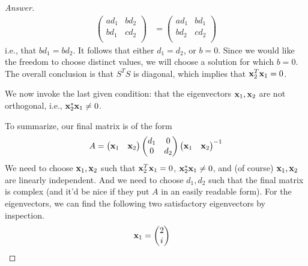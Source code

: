 \documentclass[../psets.tex]{subfiles}
\begin{document}
\begin{enumerate}[label={\textbf{2.\arabic*.}}]
\begin{enumerate}
\begin{proof}[Answer]
\begin{align*}
\begin{pmatrix}
                    ad_1 & bd_2\\
                    bd_1 & cd_2\\
                \end{pmatrix}
                &=
                \begin{pmatrix}
                    ad_1 & bd_1\\
                    bd_2 & cd_2\\
                \end{pmatrix}
            \end{align*}
            i.e., that $bd_1=bd_2$. It follows that either $d_1=d_2$, or $b=0$. Since we would like the freedom to choose distinct values, we will choose a solution for which $b=0$. The overall conclusion is that $S^TS$ is diagonal, which implies that $\mathbf{x}_2^T\mathbf{x}_1=0$.\par
            We now invoke the last given condition: that the eigenvectors $\mathbf{x}_1,\mathbf{x}_2$ are not orthogonal, i.e., $\mathbf{x}_2^*\mathbf{x}_1\neq 0$.\par
            To summarize, our final matrix is of the form
            \begin{equation*}
                A =
                \begin{pmatrix}
                    \mathbf{x}_1 & \mathbf{x}_2
                \end{pmatrix}
                \begin{pmatrix}
                    d_1 & 0\\
                    0 & d_2\\
                \end{pmatrix}
                \begin{pmatrix}
                    \mathbf{x}_1 & \mathbf{x}_2
                \end{pmatrix}^{-1}
            \end{equation*}
            We need to choose $\mathbf{x}_1,\mathbf{x}_2$ such that $\mathbf{x}_2^T\mathbf{x}_1=0$, $\mathbf{x}_2^*\mathbf{x}_1\neq 0$, and (of course) $\mathbf{x}_1,\mathbf{x}_2$ are linearly independent. And we need to choose $d_1,d_2$ such that the final matrix is complex (and it'd be nice if they put $A$ in an easily readable form). For the eigenvectors, we can find the following two satisfactory eigenvectors by inspection.
            \begin{align*}
                \x_1 &=
                \begin{pmatrix}
                    2\\
                    i\\
                \end{pmatrix}&

\end{align*}
\end{proof}
\end{enumerate}
\end{enumerate}
\end{document}
